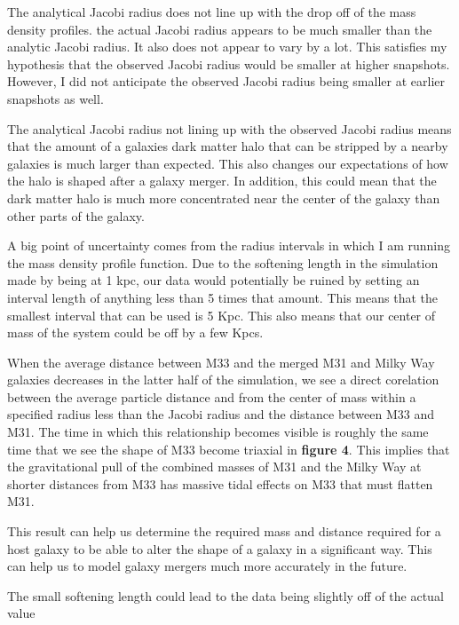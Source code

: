 \documentclass[fleqn,usenatbib]{mnras}
\begin{document}
        The analytical Jacobi radius does not line up with the drop off of the mass density profiles. the actual Jacobi radius appears to be much smaller than the analytic Jacobi radius. It also does not appear to vary by a lot. This satisfies my hypothesis that the observed Jacobi radius would be smaller at higher snapshots. However, I did not anticipate the observed Jacobi radius being smaller at earlier snapshots as well.
        
        The analytical Jacobi radius not lining up with the observed 
        Jacobi radius means that the amount of a galaxies dark matter halo that can be stripped by a nearby galaxies is much larger than expected. This also changes our expectations of how the halo is shaped after a galaxy merger. In addition, this could mean that the dark matter halo is much more concentrated near the center of the galaxy than other parts of the galaxy.

        A big point of uncertainty comes from the radius intervals in which I am running the mass density profile function. Due to the softening length in the simulation made by \citet{vanderMarel2012} being at 1 kpc, our data would potentially be ruined by setting an interval length of anything less than 5 times that amount. This means that the smallest interval that can be used is 5 Kpc. This also means that our center of mass of the system could be off by a few Kpcs. 


    When the average distance between M33 and the merged M31 and Milky Way galaxies decreases in the latter half of the simulation, we see a direct corelation between the average particle distance and from the center of mass within a specified radius less than the Jacobi radius and the distance between M33 and M31. The time in which this relationship becomes visible is roughly the same time that we see the shape of M33 become triaxial in \textbf{figure 4}. This implies that the gravitational pull of the combined masses of M31 and the Milky Way at shorter distances from M33 has massive tidal effects on M33 that must flatten M31. 

    This result can help us determine the required mass and distance required for a host galaxy to be able to alter the shape of a galaxy in a significant way. This can help us to model galaxy mergers much more accurately in the future. 

    The small softening length could lead to the data being slightly off of the actual value
\end{document}
